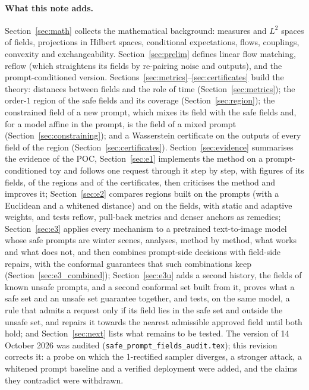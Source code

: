\documentclass{article}
\theoremstyle{plain}
\theoremstyle{remark}
\begin{document}
\paragraph{What this note adds.}
Section~\ref{sec:math} collects the mathematical background: measures and $L^2$ spaces of fields, projections in Hilbert
spaces, conditional expectations, flows, couplings, convexity and exchangeability. Section~\ref{sec:prelim} defines linear
flow matching, reflow (which straightens its fields by re-pairing noise and outputs), and the prompt-conditioned version.
Sections~\ref{sec:metrics}--\ref{sec:certificates} build the theory: distances between fields
and the role of time (Section~\ref{sec:metrics}); the order-$1$ region of the safe fields and its
coverage (Section~\ref{sec:region}); the constrained field of a new prompt, which mixes its field
with the safe fields and, for a model affine in the prompt, is the field of a mixed prompt
(Section~\ref{sec:constraining}); and a Wasserstein certificate on the outputs of every field of
the region (Section~\ref{sec:certificates}). Section~\ref{sec:evidence} summarises the evidence of the POC,
Section~\ref{sec:e1} implements the method on a prompt-conditioned toy and follows one request through it step by
step, with figures of its fields, of the regions and of the certificates, then criticises the method and improves it;
Section~\ref{sec:e2} compares regions built on the prompts (with a Euclidean and a whitened distance) and on the fields, with static
and adaptive weights, and tests reflow, pull-back metrics and denser anchors as remedies;
Section~\ref{sec:e3} applies every mechanism to a pretrained text-to-image model whose safe prompts are winter scenes, analyses,
method by method, what works and what does not, and then combines prompt-side decisions with field-side repairs, with the conformal
guarantees that such combinations keep (Section~\ref{sec:e3_combined}); Section~\ref{sec:e3u} adds a second history, the fields of known
unsafe prompts, and a second conformal set built from it, proves what a safe set and an unsafe set guarantee together, and tests, on the
same model, a rule that admits a request only if its field lies in the safe set and outside the unsafe set, and repairs it towards the
nearest admissible approved field until both hold; and Section~\ref{sec:next} lists what remains to be tested. The version of 14 October 2026 was audited
(\texttt{safe\_prompt\_fields\_audit.tex}); this revision corrects it: a probe on which the 1-rectified sampler diverges, a stronger
attack, a whitened prompt baseline and a verified deployment were added, and the claims they contradict were withdrawn.
\end{document}

